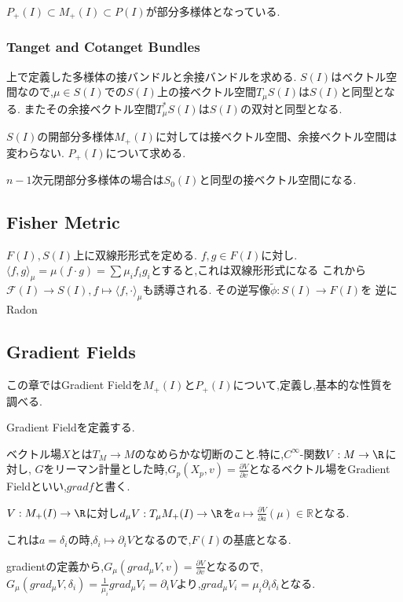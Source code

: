 \documentclass[dvipdfmx]{ujarticle}
\begin{document}
$P_+(I) \subset M_{+}(I) \subset P(I)$が部分多様体となっている.

\subsubsection{Tanget and Cotanget Bundles}
上で定義した多様体の接バンドルと余接バンドルを求める.
$S(I)$はベクトル空間なので,$\mu \in S(I)$での$S(I)$上の接ベクトル空間$T_{\mu}S(I)$は$S(I)$と同型となる.
またその余接ベクトル空間$T_{\mu}^*S(I)$は$S(I)$の双対と同型となる.

$S(I)$の開部分多様体$M_{+}(I)$に対しては接ベクトル空間、余接ベクトル空間は変わらない.
$P_+(I)$について求める.

$n-1$次元閉部分多様体の場合は$S_0(I)$と同型の接ベクトル空間になる.

\subsection{Fisher Metric}
$F(I),S(I)$上に双線形形式を定める.
$f,g \in F(I)$に対し.$\langle f, g \rangle_{\mu} = \mu(f \cdot g) = \sum \mu_i f_i g_i$とすると,これは双線形形式になる
これから$\mathcal{F}(I) \to S(I), f \mapsto \langle f, \cdot \rangle_{\mu}$も誘導される.
その逆写像$\tilde{\phi}: S(I) \to F(I)$を
逆にRadon

\subsection{Gradient Fields}
この章ではGradient Fieldを$M_+(I)$と$P_+(I)$について,定義し,基本的な性質を調べる.

Gradient Fieldを定義する.
\begin{screen}
\begin{dfn}
ベクトル場$X$とは$T_M \to M$のなめらかな切断のこと.特に,$C^{\infty}$-関数$V: M \to \R$に対し,
$G$をリーマン計量とした時,$G_p(X_p, v) = \frac{\partial V}{\partial v}$となるベクトル場をGradient Fieldといい,$grad f$と書く.
\end{dfn}
\end{screen}

$V: M_+(I) \to \R$に対し$d_{\mu}V: T_{\mu}M_+(I) \to \R$を$a \mapsto \frac{\partial V}{\partial a}(\mu) \in \mathbb{R}$となる.

これは$a = \delta_i$の時,$\delta_i \mapsto \partial_i V$となるので,$F(I)$の基底となる.

gradientの定義から,$G_{\mu}(grad_{\mu}V, v) = \frac{\partial V}{\partial v}$となるので,
$G_{\mu}(grad_{\mu}V, \delta_i) = \frac{1}{\mu_i} grad_{\mu}V_i = \partial_i V$より,$grad_{\mu}V_i = \mu_i \partial_i \delta_i$となる.
\end{document}
